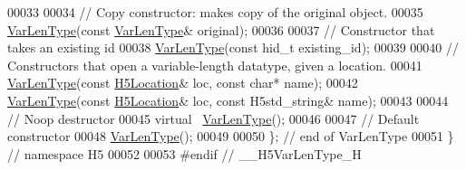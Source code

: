 \begin{DoxyCode}
00033 
00034         \textcolor{comment}{// Copy constructor: makes copy of the original object.}
00035         \hyperlink{class_h5_1_1_var_len_type}{VarLenType}(\textcolor{keyword}{const} \hyperlink{class_h5_1_1_var_len_type}{VarLenType}& original);
00036 
00037         \textcolor{comment}{// Constructor that takes an existing id}
00038         \hyperlink{class_h5_1_1_var_len_type}{VarLenType}(\textcolor{keyword}{const} hid\_t existing\_id);
00039 
00040         \textcolor{comment}{// Constructors that open a variable-length datatype, given a location.}
00041         \hyperlink{class_h5_1_1_var_len_type}{VarLenType}(\textcolor{keyword}{const} \hyperlink{class_h5_1_1_h5_location}{H5Location}& loc, \textcolor{keyword}{const} \textcolor{keywordtype}{char}* name);
00042         \hyperlink{class_h5_1_1_var_len_type}{VarLenType}(\textcolor{keyword}{const} \hyperlink{class_h5_1_1_h5_location}{H5Location}& loc, \textcolor{keyword}{const} H5std\_string& name);
00043 
00044         \textcolor{comment}{// Noop destructor}
00045         \textcolor{keyword}{virtual} ~\hyperlink{class_h5_1_1_var_len_type}{VarLenType}();
00046 
00047         \textcolor{comment}{// Default constructor}
00048         \hyperlink{class_h5_1_1_var_len_type}{VarLenType}();
00049 
00050 \}; \textcolor{comment}{// end of VarLenType}
00051 \} \textcolor{comment}{// namespace H5}
00052 
00053 \textcolor{preprocessor}{#endif // \_\_H5VarLenType\_H}
\end{DoxyCode}
